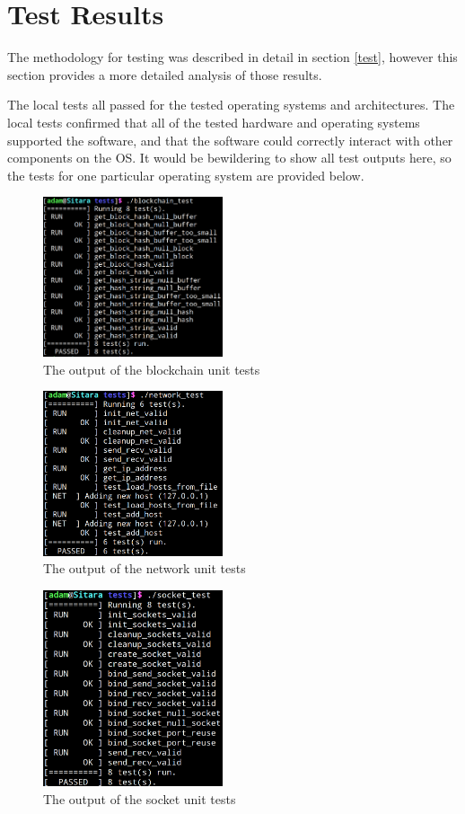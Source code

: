 \documentclass[a4paper, 11pt]{report}
\begin{document}
\section{Test Results}
The methodology for testing was described in detail in section \ref{test}, however this section provides a more detailed analysis of those results. 

The local tests all passed for the tested operating systems and architectures. The local tests confirmed that all of the tested hardware and operating systems supported the software, and that the software could correctly interact with other components on the \acrshort{OS}. It would be bewildering to show all test outputs here, so the tests for one particular operating system are provided below.

\begin{figure}[H]
\centering
\includegraphics[width=200px,keepaspectratio]{blockchain_test}
\caption{The output of the blockchain unit tests} 
\label{fig:blockchaintest}
\end{figure}

\begin{figure}[H]
\centering
\includegraphics[width=200px,keepaspectratio]{net_test}
\caption{The output of the network unit tests} 
\label{fig:nettest}
\end{figure}

\begin{figure}[H]
\centering
\includegraphics[width=200px,keepaspectratio]{socket_test}
\caption{The output of the socket unit tests} 
\label{fig:nettest}
\end{figure}
\end{document}
